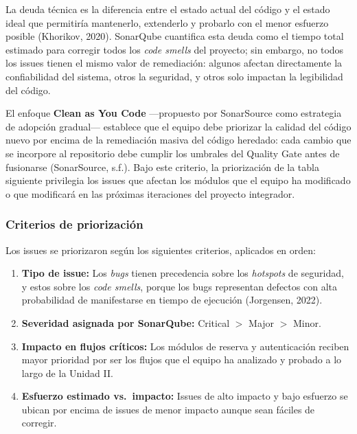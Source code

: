 \documentclass{article}
\begin{document}
La deuda técnica es la diferencia entre el estado actual del código y el estado ideal
que permitiría mantenerlo, extenderlo y probarlo con el menor esfuerzo posible
(Khorikov, 2020). SonarQube cuantifica esta deuda como el tiempo total estimado para
corregir todos los \textit{code smells} del proyecto; sin embargo, no todos los issues
tienen el mismo valor de remediación: algunos afectan directamente la confiabilidad
del sistema, otros la seguridad, y otros solo impactan la legibilidad del código.

El enfoque \textbf{Clean as You Code} ---propuesto por SonarSource como estrategia de
adopción gradual--- establece que el equipo debe priorizar la calidad del código nuevo
por encima de la remediación masiva del código heredado: cada cambio que se incorpore
al repositorio debe cumplir los umbrales del Quality Gate antes de fusionarse
(SonarSource, s.f.). Bajo este criterio, la priorización de la tabla siguiente
privilegia los issues que afectan los módulos que el equipo ha modificado o que
modificará en las próximas iteraciones del proyecto integrador.

\subsubsection{Criterios de priorización}

Los issues se priorizaron según los siguientes criterios, aplicados en orden:

\begin{enumerate}[leftmargin=*]
  \item \textbf{Tipo de issue:} Los \textit{bugs} tienen precedencia sobre los
        \textit{hotspots} de seguridad, y estos sobre los \textit{code smells},
        porque los bugs representan defectos con alta probabilidad de manifestarse
        en tiempo de ejecución (Jorgensen, 2022).
  \item \textbf{Severidad asignada por SonarQube:} Critical $>$ Major $>$ Minor.
  \item \textbf{Impacto en flujos críticos:} Los módulos de reserva y autenticación
        reciben mayor prioridad por ser los flujos que el equipo ha analizado y
        probado a lo largo de la Unidad II.
  \item \textbf{Esfuerzo estimado vs.\ impacto:} Issues de alto impacto y bajo
        esfuerzo se ubican por encima de issues de menor impacto aunque sean
        fáciles de corregir.
\end{enumerate}
\end{document}

